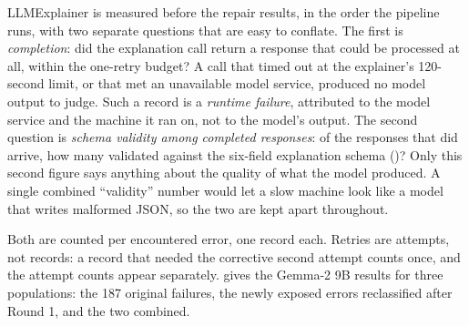 LLMExplainer is measured before the repair results, in the order the
pipeline runs, with two separate questions that are easy to conflate.
The first is \emph{completion}: did the explanation call return a response
that could be processed at all, within the one-retry budget? A call that
timed out at the explainer's 120-second limit, or that met an unavailable
model service, produced no model output to judge. Such a record is a
\emph{runtime failure}, attributed to the model service and the machine it
ran on, not to the model's output. The second question is \emph{schema
validity among completed responses}: of the responses that did arrive, how
many validated against the six-field explanation schema
()? Only this second figure says
anything about the quality of what the model produced. A single combined
``validity'' number would let a slow machine look like a model that writes
malformed JSON, so the two are kept apart throughout.

Both are counted per encountered error, one record each. Retries are
attempts, not records: a record that needed the corrective second attempt
counts once, and the attempt counts appear separately.
 gives the Gemma-2 9B results for three
populations: the 187 original failures, the newly exposed errors
reclassified after Round 1, and the two combined.


